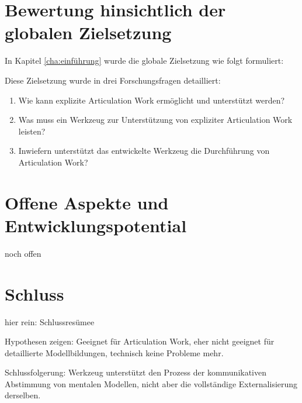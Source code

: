 \section{Bewertung hinsichtlich der globalen Zielsetzung}

In Kapitel \ref{cha:einführung} wurde die globale Zielsetzung wie folgt formuliert:


Diese Zielsetzung wurde in drei Forschungsfragen detailliert:
\begin{enumerate}
	\item Wie kann explizite Articulation Work ermöglicht und unterstützt werden?
	\item Was muss ein Werkzeug zur Unterstützung von expliziter Articulation Work leisten?
	\item Inwiefern unterstützt das entwickelte Werkzeug die Durchführung von Articulation Work?
\end{enumerate}

\section{Offene Aspekte und Entwicklungspotential}

noch offen

\section{Schluss}

hier rein: Schlussresümee

Hypothesen zeigen: Geeignet für Articulation Work, eher nicht geeignet für detaillierte Modellbildungen, technisch keine Probleme mehr.

Schlussfolgerung: Werkzeug unterstützt den Prozess der kommunikativen Abstimmung von mentalen Modellen, nicht aber die vollständige Externalisierung derselben.

